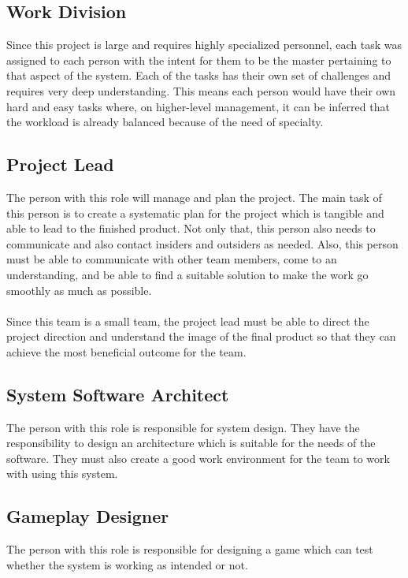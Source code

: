 

\subsection{Work Division}
\label{subsec:work-division}

Since this project is large and requires highly specialized personnel, each task was assigned
to each person with the intent for them to be the master pertaining to that aspect of the system.
Each of the tasks has their own set of challenges and requires very deep understanding.
This means each person would have their own hard and easy tasks where, on higher-level management,
it can be inferred that the workload is already balanced because of the need of specialty.

\subsection*{Project Lead}
The person with this role will manage and plan the project.
The main task of this person is to create a systematic plan for the project which is tangible and able to lead to the finished product.
Not only that, this person also needs to communicate and also contact insiders and outsiders as needed.
Also, this person must be able to communicate with other team members, come to an understanding, and be able to find a
suitable solution to make the work go smoothly as much as possible.
\\\\
Since this team is a small team, the project lead must be able to direct the project direction and understand the image
of the final product so that they can achieve the most beneficial outcome for the team.

\subsection*{System Software Architect}
The person with this role is responsible for system design.
They have the responsibility to design an architecture which is
suitable for the needs of the software.
They must also create a good work environment for the team to work
with using this system.

\subsection*{Gameplay Designer}
The person with this role is responsible for designing a game which can test whether
the system is working as intended or not.

